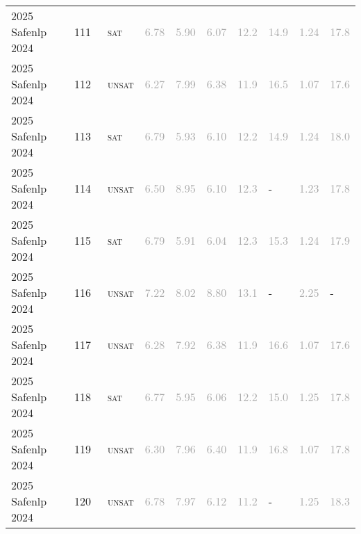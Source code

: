 \begin{center}
{\begin{longtable}{@{}llllllllll@{}}
2025 Safenlp 2024 & 111 & ~\textsc{sat} & \textcolor{darkgray}{6.78} & \textcolor{darkgray}{5.90} & \textcolor{darkgray}{6.07} & \textcolor{darkgray}{12.2} & \textcolor{darkgray}{14.9} & \textcolor{darkgray}{1.24} & \textcolor{darkgray}{17.8} \\
2025 Safenlp 2024 & 112 & ~\textsc{unsat} & \textcolor{darkgray}{6.27} & \textcolor{darkgray}{7.99} & \textcolor{darkgray}{6.38} & \textcolor{darkgray}{11.9} & \textcolor{darkgray}{16.5} & \textcolor{darkgray}{1.07} & \textcolor{darkgray}{17.6} \\
2025 Safenlp 2024 & 113 & ~\textsc{sat} & \textcolor{darkgray}{6.79} & \textcolor{darkgray}{5.93} & \textcolor{darkgray}{6.10} & \textcolor{darkgray}{12.2} & \textcolor{darkgray}{14.9} & \textcolor{darkgray}{1.24} & \textcolor{darkgray}{18.0} \\
2025 Safenlp 2024 & 114 & ~\textsc{unsat} & \textcolor{darkgray}{6.50} & \textcolor{darkgray}{8.95} & \textcolor{darkgray}{6.10} & \textcolor{darkgray}{12.3} & - & \textcolor{darkgray}{1.23} & \textcolor{darkgray}{17.8} \\
2025 Safenlp 2024 & 115 & ~\textsc{sat} & \textcolor{darkgray}{6.79} & \textcolor{darkgray}{5.91} & \textcolor{darkgray}{6.04} & \textcolor{darkgray}{12.3} & \textcolor{darkgray}{15.3} & \textcolor{darkgray}{1.24} & \textcolor{darkgray}{17.9} \\
2025 Safenlp 2024 & 116 & ~\textsc{unsat} & \textcolor{darkgray}{7.22} & \textcolor{darkgray}{8.02} & \textcolor{darkgray}{8.80} & \textcolor{darkgray}{13.1} & - & \textcolor{darkgray}{2.25} & - \\
2025 Safenlp 2024 & 117 & ~\textsc{unsat} & \textcolor{darkgray}{6.28} & \textcolor{darkgray}{7.92} & \textcolor{darkgray}{6.38} & \textcolor{darkgray}{11.9} & \textcolor{darkgray}{16.6} & \textcolor{darkgray}{1.07} & \textcolor{darkgray}{17.6} \\
2025 Safenlp 2024 & 118 & ~\textsc{sat} & \textcolor{darkgray}{6.77} & \textcolor{darkgray}{5.95} & \textcolor{darkgray}{6.06} & \textcolor{darkgray}{12.2} & \textcolor{darkgray}{15.0} & \textcolor{darkgray}{1.25} & \textcolor{darkgray}{17.8} \\
2025 Safenlp 2024 & 119 & ~\textsc{unsat} & \textcolor{darkgray}{6.30} & \textcolor{darkgray}{7.96} & \textcolor{darkgray}{6.40} & \textcolor{darkgray}{11.9} & \textcolor{darkgray}{16.8} & \textcolor{darkgray}{1.07} & \textcolor{darkgray}{17.8} \\
2025 Safenlp 2024 & 120 & ~\textsc{unsat} & \textcolor{darkgray}{6.78} & \textcolor{darkgray}{7.97} & \textcolor{darkgray}{6.12} & \textcolor{darkgray}{11.2} & - & \textcolor{darkgray}{1.25} & \textcolor{darkgray}{18.3} \\

\end{longtable}}
\end{center}

